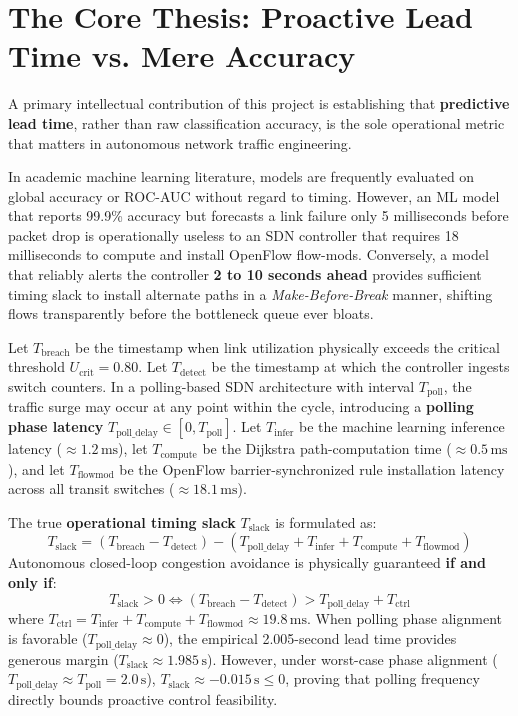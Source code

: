 \section{The Core Thesis: Proactive Lead Time vs. Mere Accuracy}
A primary intellectual contribution of this project is establishing that \textbf{predictive lead time}, rather than raw classification accuracy, is the sole operational metric that matters in autonomous network traffic engineering.

In academic machine learning literature, models are frequently evaluated on global accuracy or ROC-AUC without regard to timing. However, an ML model that reports 99.9\% accuracy but forecasts a link failure only 5 milliseconds before packet drop is operationally useless to an SDN controller that requires 18 milliseconds to compute and install OpenFlow flow-mods. Conversely, a model that reliably alerts the controller \textbf{2 to 10 seconds ahead} provides sufficient timing slack to install alternate paths in a \textit{Make-Before-Break} manner, shifting flows transparently before the bottleneck queue ever bloats.

\begin{formulabox}
Let $T_{\text{breach}}$ be the timestamp when link utilization physically exceeds the critical threshold $U_{\text{crit}} = 0.80$. Let $T_{\text{detect}}$ be the timestamp at which the controller ingests switch counters. In a polling-based SDN architecture with interval $T_{\text{poll}}$, the traffic surge may occur at any point within the cycle, introducing a \textbf{polling phase latency} $T_{\text{poll\_delay}} \in [0, T_{\text{poll}}]$. Let $T_{\text{infer}}$ be the machine learning inference latency ($\approx 1.2\,\text{ms}$), let $T_{\text{compute}}$ be the Dijkstra path-computation time ($\approx 0.5\,\text{ms}$), and let $T_{\text{flowmod}}$ be the OpenFlow barrier-synchronized rule installation latency across all transit switches ($\approx 18.1\,\text{ms}$).

The true \textbf{operational timing slack} $T_{\text{slack}}$ is formulated as:
\begin{equation}
  T_{\text{slack}} = (T_{\text{breach}} - T_{\text{detect}}) - (T_{\text{poll\_delay}} + T_{\text{infer}} + T_{\text{compute}} + T_{\text{flowmod}})
\end{equation}
Autonomous closed-loop congestion avoidance is physically guaranteed \textbf{if and only if}:
\begin{equation}
  T_{\text{slack}} > 0 \iff (T_{\text{breach}} - T_{\text{detect}}) > T_{\text{poll\_delay}} + T_{\text{ctrl}}
\end{equation}
where $T_{\text{ctrl}} = T_{\text{infer}} + T_{\text{compute}} + T_{\text{flowmod}} \approx 19.8\,\text{ms}$. When polling phase alignment is favorable ($T_{\text{poll\_delay}} \approx 0$), the empirical 2.005-second lead time provides generous margin ($T_{\text{slack}} \approx 1.985\,\text{s}$). However, under worst-case phase alignment ($T_{\text{poll\_delay}} \approx T_{\text{poll}} = 2.0\,\text{s}$), $T_{\text{slack}} \approx -0.015\,\text{s} \le 0$, proving that polling frequency directly bounds proactive control feasibility.
\end{formulabox}

